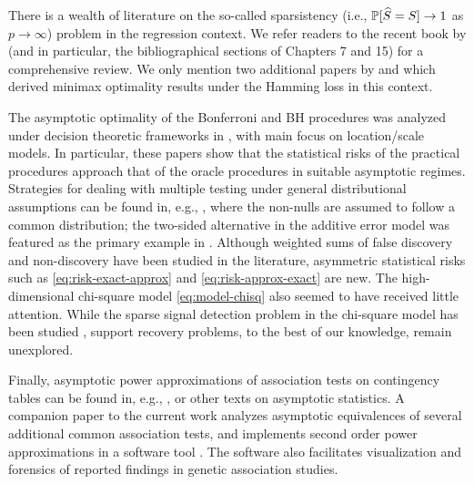 There is a wealth of literature on the so-called sparsistency (i.e., $\P[\widehat{S} = S]\to 1$ as $p\to\infty$) problem in the regression context. 
We refer readers to the recent book by \citet{wainwright2019high} (and in particular, the bibliographical sections of Chapters 7 and 15) for a comprehensive review.
We only mention two additional papers by \citet{ji2012ups} and \citet{jin2014optimality} which derived minimax optimality results under the Hamming loss in this context.

The asymptotic optimality of the Bonferroni and BH procedures 
was analyzed under decision theoretic frameworks in \cite{genovese2002operating, bogdan2011asymptotic, neuvial2012false}, with main focus on location/scale models. In particular, these papers show that the statistical risks of the practical procedures approach that of the oracle procedures in suitable asymptotic regimes.
Strategies for dealing with multiple testing under general distributional assumptions can be found in, e.g., \cite{efron2004large, storey2007optimal, sun2007oracle}, where the non-nulls are assumed to follow a common distribution; the two-sided alternative in the additive error model was featured as the primary example in \cite{sun2007oracle}.
Although weighted sums of false discovery and non-discovery have been studied in the literature, asymmetric statistical risks such as \eqref{eq:risk-exact-approx} and \eqref{eq:risk-approx-exact} are new.
The high-dimensional chi-square model \eqref{eq:model-chisq} also seemed to have received little attention.
While the sparse signal detection problem in the chi-square model has been studied \cite{donoho2004higher}, support recovery problems, to the best of our knowledge, remain unexplored.

Finally, asymptotic power approximations of association tests on contingency tables can be found in, e.g., \citet{ferguson2017course}, or other texts on asymptotic statistics.
A companion paper to the current work analyzes asymptotic equivalences of several additional common association tests, and implements second order power approximations in a software tool \cite{gao2019upass}. 
The software also facilitates visualization and forensics of reported findings in genetic association studies.


